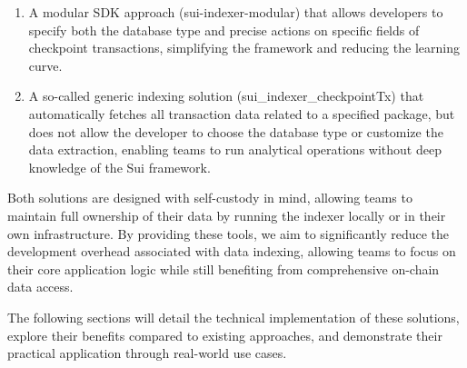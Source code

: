 \begin{enumerate}
    \item A modular SDK approach (sui-indexer-modular) that allows developers to specify both the database type and precise actions on specific fields of checkpoint transactions, simplifying the framework and reducing the learning curve.
    \item A so-called generic indexing solution (sui\_indexer\_checkpointTx) that automatically fetches all transaction data related to a specified package, but does not allow the developer to choose the database type or customize the data extraction, enabling teams to run analytical operations without deep knowledge of the Sui framework.
\end{enumerate}

Both solutions are designed with self-custody in mind, allowing teams to maintain full ownership of their data by running the indexer locally or in their own infrastructure. By providing these tools, we aim to significantly reduce the development overhead associated with data indexing, allowing teams to focus on their core application logic while still benefiting from comprehensive on-chain data access.

The following sections will detail the technical implementation of these solutions, explore their benefits compared to existing approaches, and demonstrate their practical application through real-world use cases. 